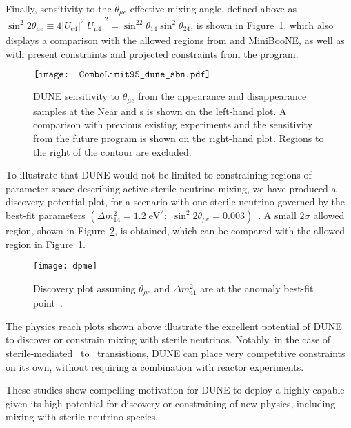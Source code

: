   
Finally, sensitivity to the $\theta_{\mu e}$ effective mixing angle, defined above as $\sin^2{2\theta_{\mu e}}\equiv 4|U_{e4}|^2|U_{\mu 4}|^2=\sin^22\theta_{14}\sin^2\theta_{24}$, is shown in Figure~\ref{th_me}, which also displays a comparison with the allowed regions from  and MiniBooNE, as well as with present constraints and projected constraints from the \fnal {} program.
\begin{figure}[!htbp]
\centering
$\vcenter{\hbox{\texttt{[image: ComboLimit95\_dune\_sbn.pdf]}}}$
\caption[Sensitivity to $\theta_{\mu e}$ from the appearance and disappearance samples]{DUNE sensitivity to $\theta_{\mu e}$ from the appearance and disappearance samples at the Near and s is shown on the left-hand plot. A comparison with previous existing experiments and the sensitivity from the future  program is shown on the right-hand plot. Regions to the right of the contour are excluded.}
\label{th_me}
\end{figure}

To illustrate that DUNE would not be limited to constraining regions of parameter space describing active-sterile neutrino mixing, we have produced a discovery potential plot, for a scenario with one sterile neutrino governed by the  best-fit parameters $\left(\Delta m_{14}^2= 1.2\;\text{eV}^2;\,\,\sin^2{2\theta_{\mu e}}=0.003\right)$~\cite{LSNDSterile}. A small $2\sigma$ allowed region, shown in Figure~\ref{Dis_plot_me}, is obtained, which can be compared with the  allowed region in Figure~\ref{th_me}. 
\begin{figure}[!h]
\centering
\texttt{[image: dpme]}
\caption[Discovery plot assuming $\theta_{\mu e}$ and $\Delta m_{41}^2$ are at the  anomaly best-fit point]{Discovery plot assuming $\theta_{\mu e}$ and $\Delta m_{41}^2$ are at the  anomaly best-fit point~\cite{LSNDSterile}.}
\label{Dis_plot_me}
\end{figure}

The physics reach plots shown above illustrate the excellent potential of DUNE to discover or constrain mixing with sterile neutrinos. Notably, in the case of sterile-mediated \numu~to \nue~transistions, DUNE can place very competitive constraints on its own, without requiring a combination with reactor experiments. 

These studies show compelling motivation for DUNE to deploy a highly-capable   given its high potential for discovery or constraining of new physics, including mixing with sterile neutrino species.


